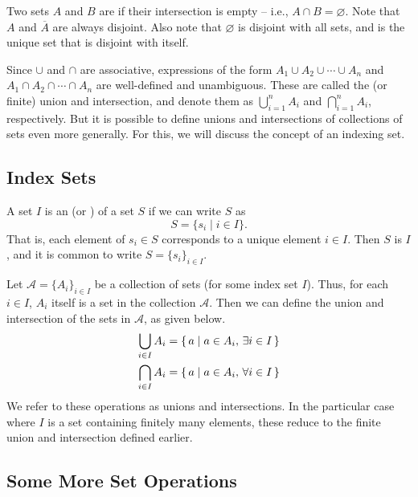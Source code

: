 Two sets $A$ and $B$ are  if their intersection is empty -- i.e., $A \cap B = \varnothing$. Note that $A$ and $\overline A$ are always disjoint. Also note that $\varnothing$ is disjoint with all sets, and is the unique set that is disjoint with itself.

Since $\cup$ and $\cap$ are associative, expressions of the form $A_1 \cup A_2 \cup \cdots \cup A_n$ and $A_1 \cap A_2 \cap \cdots \cap A_n$ are well-defined and unambiguous. These are called the  (or finite) union and intersection, and denote them as $\bigcup_{i=1}^n A_i$ and $\bigcap_{i=1}^n A_i$, respectively. But it is possible to define unions and intersections of collections of sets even more generally. For this, we will discuss the concept of an indexing set.

\subsection{Index Sets}\label{subsec:IndexSets}

A set $I$ is an  (or ) of a set $S$ if we can write $S$ as
\begin{equation*}
S = \{ s_i \mid i \in I\}.
\end{equation*}
That is, each element of $s_i \in S$ corresponds to a unique element $i \in I$. Then $S$ is  $I$, and it is common to write $S = \{ s_i \}_{i \in I}$.

Let $\mathcal A = \{ A_i \}_{i \in I}$ be a collection of sets (for some index set $I$). Thus, for each $i \in I$, $A_i$ itself is a set in the collection $\mathcal A$. Then we can define the union and intersection of the sets in $\mathcal A$, as given below.
\begin{align*}
\bigcup_{i \in I} A_i & = \qty{\, a \mid a \in A_i,\, \exists i \in I \,} \\
\bigcap_{i \in I} A_i & = \qty{\, a \mid a \in A_i,\, \forall i \in I \,}
\end{align*}
We refer to these operations as  unions and intersections. In the particular case where $I$ is a set containing finitely many elements, these reduce to the finite union and intersection defined earlier.

\subsection{Some More Set Operations}\label{subsec:MoreSetOps}

